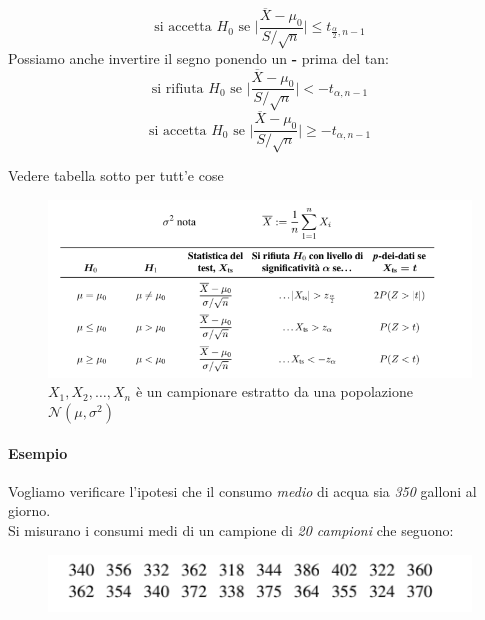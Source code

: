 \documentclass[]{article}
\begin{document}
    \[ \text{si accetta } H_0 \text{ se } \big| \frac{\overline{X} - \mu_0}{S / \sqrt{n}} \big| \leq t_{\frac{\alpha}{2}, n-1} \]
    Possiamo anche invertire il segno ponendo un \textbf{-} prima del tan:
    \[ \text{si rifiuta } H_0 \text{ se } \big| \frac{\overline{X} - \mu_0}{S / \sqrt{n}} \big| < - t_{\alpha, n-1} \]
    \[ \text{si accetta } H_0 \text{ se } \big| \frac{\overline{X} - \mu_0}{S / \sqrt{n}} \big| \geq - t_{\alpha, n-1} \]
    \centerline{Vedere tabella sotto per tutt'e cose}
    \begin{figure}[H]
        \caption{$X_1, X_2, \ldots, X_n$ è un campionare estratto da una popolazione $\mathcal{N}(\mu, \sigma^2)$}
        \includegraphics[width=\textwidth]{images/boh_7.png}
    \end{figure}
    \paragraph{Esempio} Vogliamo verificare l'ipotesi che il consumo \textit{medio} di acqua sia \textit{350} galloni al giorno. \\
    Si misurano i consumi medi di un campione di \textit{20 campioni} che seguono:
    \begin{figure}[H]
        \includegraphics[width=\textwidth]{images/boh_8.png}
    \end{figure}
\end{document}
